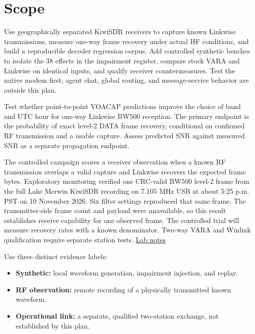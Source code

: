 \documentclass[11pt,a4paper]{article}
\begin{document}
\begingroup\footnotesize
\tableofcontents
\endgroup
\clearpage
\section{Scope}
\label{tp:scope}

Use geographically separated KiwiSDR receivers to capture known Linkwise transmissions, measure one-way frame recovery under actual HF conditions, and build a reproducible decoder regression corpus. Add controlled synthetic benches to isolate the 38 effects in the impairment register, compare stock VARA and Linkwise on identical inputs, and qualify receiver countermeasures. Test the native modem first; agent chat, global routing, and message-service behavior are outside this plan.

Test whether point-to-point VOACAP predictions improve the choice of band and UTC hour for one-way Linkwise BW500 reception. The primary endpoint is the probability of exact level-2 DATA frame recovery, conditional on confirmed RF transmission and a usable capture. Assess predicted SNR against measured SNR as a separate propagation endpoint.

The controlled campaign scores a receiver observation when a known RF transmission overlaps a valid capture and Linkwise recovers the expected frame bytes. Exploratory monitoring verified one CRC-valid BW500 level-2 frame from the full Lake Merwin KiwiSDR recording on 7.105 MHz USB at about 5:25 p.m. PST on 10 November 2026. Six filter settings reproduced that same frame. The transmitter-side frame count and payload were unavailable, so this result establishes receive capability for one observed frame. The controlled trial will measure recovery rates with a known denominator. Two-way VARA and Winlink qualification require separate station tests. \href{../../../rust/docs/../../lab-notes/lab-notes.pdf}{Lab notes}

Use three distinct evidence labels:

\begin{itemize}
\item \textbf{Synthetic:} local waveform generation, impairment injection, and replay.
\item \textbf{RF observation:} remote recording of a physically transmitted known waveform.
\item \textbf{Operational link:} a separate, qualified two-station exchange, not established by this plan.
\end{itemize}
\end{document}
